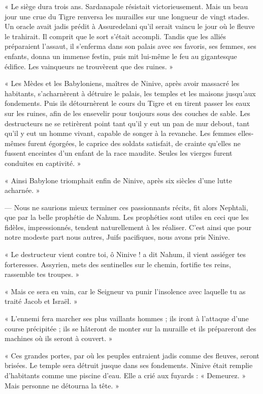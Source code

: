 \documentclass[a4paper, 11pt, oneside, polutonikogreek, french]{article}
\begin{document}
« Le siège dura trois ans. Sardanapale résistait victorieusement. Mais un beau jour une crue du Tigre renversa les murailles sur une longueur de vingt stades. Un oracle avait jadis prédit à Assuredelani qu'il serait vaincu le jour où le fleuve le trahirait. Il comprit que le sort s'était accompli. Tandis que les alliés préparaient l'assaut, il s'enferma dans son palais avec ses favoris, ses femmes, ses enfants, donna un immense festin, puis mit lui-même le feu au gigantesque édifice. Les vainqueurs ne trouvèrent que des ruines. »

« Les Mèdes et les Babyloniens, maîtres de Ninive, après avoir massacré les habitants, s'acharnèrent à détruire le palais, les temples et les maisons jusqu'aux fondements. Puis ils détournèrent le cours du Tigre et en tirent passer les eaux sur les ruines, afin de les ensevelir pour toujours sous des couches de sable. Les destructeurs ne se retirèrent point tant qu'il y eut un pan de mur debout, tant qu'il y eut un homme vivant, capable de songer à la revanche. Les femmes elles-mêmes furent égorgées, le caprice des soldats satisfait, de crainte qu'elles ne fussent enceintes d'un enfant de la race maudite. Seules les vierges furent conduites en captivité. »

« Ainsi Babylone triomphait enfin de Ninive, après six siècles d'une lutte acharnée. »

--- Nous ne saurions mieux terminer ces passionnants récits, fit alors Nephtali, que par la belle prophétie de Nahum. Les prophéties sont utiles en ceci que les fidèles, impressionnés, tendent naturellement à les réaliser. C'est ainsi que pour notre modeste part nous autres, Juifs pacifiques, nous avons pris Ninive.

« Le destructeur vient contre toi, ô Ninive ! a dit Nahum, il vient assiéger tes forteresses. Assyrien, mets des sentinelles sur le chemin, fortifie tes reins, rassemble tes troupes. »

« Mais ce sera en vain, car le Seigneur va punir l'insolence avec laquelle tu as traité Jacob et Israël. »

« L'ennemi fera marcher ses plus vaillants hommes ; ils iront à l'attaque d'une course précipitée ; ils se hâteront de monter sur la muraille et ils prépareront des machines où ils seront à couvert. »

« Ces grandes portes, par où les peuples entraient jadis comme des fleuves, seront brisées. Le temple sera détruit jusque dans ses fondements. Ninive était remplie d'habitants comme une piscine d'eau. Elle a crié aux fuyards : « Demeurez. » Mais personne ne détourna la tête. »
\end{document}
